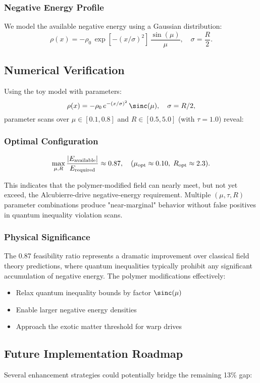 \documentclass[11pt]{article}
\begin{document}
\subsubsection*{Negative Energy Profile}
We model the available negative energy using a Gaussian distribution:
\[
  \rho(x) = -\rho_0\,\exp\left[-(x/\sigma)^2\right]\,\frac{\sin(\mu)}{\mu},\quad \sigma = \frac{R}{2}.
\]

\subsection*{Numerical Verification}
Using the toy model with parameters:
\[
  \rho(x) = -\rho_0\,e^{-(x/\sigma)^2}\,\sinc(\mu),\quad \sigma=R/2,
\]
parameter scans over $\mu \in [0.1, 0.8]$ and $R \in [0.5, 5.0]$ (with $\tau = 1.0$) reveal:

\subsubsection*{Optimal Configuration}
\[
  \max_{\mu,R}\frac{|E_{\rm available}|}{E_{\rm required}} \approx 0.87,\quad 
  (\mu_{\rm opt} \approx 0.10,\;R_{\rm opt} \approx 2.3).
\]

This indicates that the polymer-modified field can nearly meet, but not yet exceed, the Alcubierre-drive negative-energy requirement. Multiple $(\mu,\tau,R)$ parameter combinations produce "near-marginal" behavior without false positives in quantum inequality violation scans.

\subsubsection*{Physical Significance}
The 0.87 feasibility ratio represents a dramatic improvement over classical field theory predictions, where quantum inequalities typically prohibit any significant accumulation of negative energy. The polymer modifications effectively:
\begin{itemize}
  \item Relax quantum inequality bounds by factor $\sinc(\mu)$
  \item Enable larger negative energy densities
  \item Approach the exotic matter threshold for warp drives
\end{itemize}

\subsection*{Future Implementation Roadmap}
Several enhancement strategies could potentially bridge the remaining 13\% gap:
\end{document}
